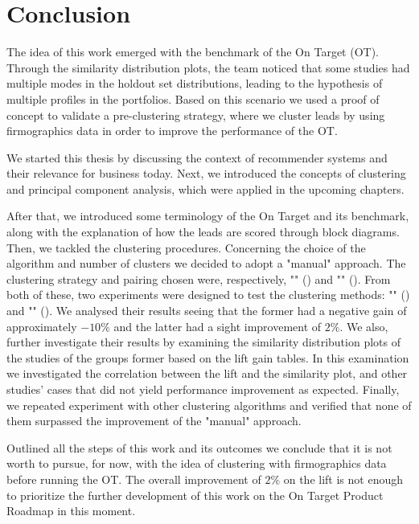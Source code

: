 \chapter{Conclusion} 
\label{cha:conclusion}

The idea of this work emerged with the benchmark of the On Target (OT). Through the similarity distribution plots, the team noticed that some studies had multiple modes in the holdout set distributions, leading to the hypothesis of multiple profiles in the portfolios. Based on this scenario we used a proof of concept to validate a pre-clustering strategy, where we cluster leads by using firmographics data in order to improve the performance of the OT.

We started this thesis by discussing the context of recommender systems and their relevance for business today. Next, we introduced the concepts of clustering and principal component analysis, which were applied in the upcoming chapters.

After that, we introduced some terminology of the On Target and its benchmark, along with the explanation of how the leads are scored through block diagrams. Then, we tackled the clustering procedures. Concerning the choice of the algorithm and number of clusters we decided to adopt a "manual" approach. The clustering strategy and pairing chosen were, respectively, "\fullNameClusterStrategyA{}" (\nameClusterStrategyA{}) and "\fullNameClusterPairingA{}" (\nameClusterPairingA{}). From both of these, two experiments were designed to test the clustering methods: "\fullNameExperimentI{}" (\nameExperimentI{}) and "\fullNameExperimentII{}" (\nameExperimentII{}).
We analysed their results seeing that the former had a negative gain of approximately $-10\%$ and the latter had a sight improvement of $2\%$. We also, further investigate their results by examining the similarity distribution plots of the studies of the groups former based on the lift gain tables. In this examination we investigated the correlation between the lift and the similarity plot, and other studies' cases that did not yield performance improvement as expected. Finally, we repeated experiment \nameExperimentII{} with other clustering algorithms and verified that none of them surpassed the improvement of the "manual" approach.

Outlined all the steps of this work and its outcomes we conclude that it is not worth to pursue, for now, with the idea of clustering with firmographics data before running the OT. The overall improvement of $2\%$ on the lift is not enough to prioritize the further development of this work on the On Target Product Roadmap in this moment.

